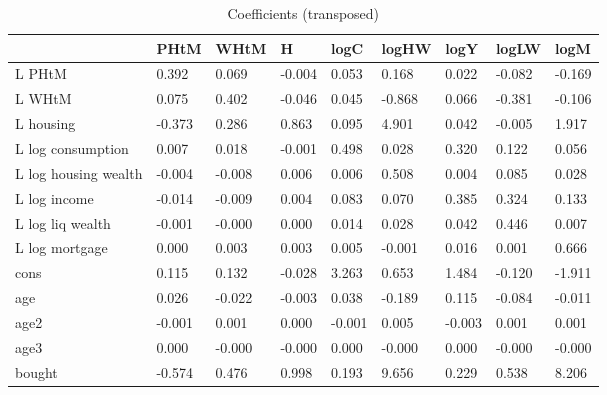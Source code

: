 \begin{table}[htbp]
\caption{\label{clabel} Coefficients (transposed)}\centering\medskip
\begin{tabular}{lllllllll} \hline \hline
 & PHtM  & WHtM  & H  & logC  & logHW  & logY  & logLW  & logM  \\  \hline 
L PHtM &     0.392 &     0.069 &    -0.004 &     0.053 &     0.168 &     0.022 &    -0.082 &    -0.169 \\  
L WHtM &     0.075 &     0.402 &    -0.046 &     0.045 &    -0.868 &     0.066 &    -0.381 &    -0.106 \\  
L housing &    -0.373 &     0.286 &     0.863 &     0.095 &     4.901 &     0.042 &    -0.005 &     1.917 \\  
L log consumption &     0.007 &     0.018 &    -0.001 &     0.498 &     0.028 &     0.320 &     0.122 &     0.056 \\  
L log housing wealth &    -0.004 &    -0.008 &     0.006 &     0.006 &     0.508 &     0.004 &     0.085 &     0.028 \\  
L log income &    -0.014 &    -0.009 &     0.004 &     0.083 &     0.070 &     0.385 &     0.324 &     0.133 \\  
L log liq wealth &    -0.001 &    -0.000 &     0.000 &     0.014 &     0.028 &     0.042 &     0.446 &     0.007 \\  
L log mortgage &     0.000 &     0.003 &     0.003 &     0.005 &    -0.001 &     0.016 &     0.001 &     0.666 \\  
cons &     0.115 &     0.132 &    -0.028 &     3.263 &     0.653 &     1.484 &    -0.120 &    -1.911 \\  
age &     0.026 &    -0.022 &    -0.003 &     0.038 &    -0.189 &     0.115 &    -0.084 &    -0.011 \\  
age2 &    -0.001 &     0.001 &     0.000 &    -0.001 &     0.005 &    -0.003 &     0.001 &     0.001 \\  
age3 &     0.000 &    -0.000 &    -0.000 &     0.000 &    -0.000 &     0.000 &    -0.000 &    -0.000 \\  
bought &    -0.574 &     0.476 &     0.998 &     0.193 &     9.656 &     0.229 &     0.538 &     8.206 \\  
\hline \hline \end{tabular}
\end{table}
